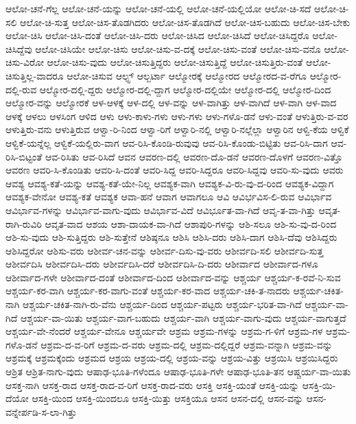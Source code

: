{ಆಲೋ-ಚನೆ-ಗೆಲ್ಲ
ಆಲೋ-ಚನೆ-ಯನ್ನು
ಆಲೋ-ಚನೆ-ಯಲ್ಲಿ
ಆಲೋ-ಚನೆ-ಯಲ್ಲಿಯೋ
ಆಲೋ-ಚಿ-ಸದೆ
ಆಲೋ-ಚಿ-ಸಲಿ
ಆಲೋ-ಚಿ-ಸುತ್ತ
ಆಲೋ-ಚಿಸ-ತೊಡಗಿದರು
ಆಲೋ-ಚಿಸ-ತೊಡಗಿದೆ
ಆಲೋ-ಚಿಸ-ಬಹುದು
ಆಲೋ-ಚಿಸ-ಬೇಕು
ಆಲೋ-ಚಿಸಿ
ಆಲೋ-ಚಿಸಿ-ದಂತೆ
ಆಲೋ-ಚಿಸಿ-ದರು
ಆಲೋ-ಚಿಸಿದ
ಆಲೋ-ಚಿಸಿದೆ
ಆಲೋ-ಚಿಸಿದ್ದರೊ
ಆಲೋ-ಚಿಸಿದ್ದೆವು
ಆಲೋ-ಚಿಸಿಯೇ
ಆಲೋ-ಚಿಸು
ಆಲೋ-ಚಿಸು-ವ-ದಕ್ಕೆ
ಆಲೋ-ಚಿಸು-ವಂತೆ
ಆಲೋ-ಚಿಸು-ವನೊ
ಆಲೋ-ಚಿಸು-ವಿರೋ
ಆಲೋ-ಚಿಸು-ವುದು
ಆಲೋ-ಚಿಸುತ್ತಿದ್ದರು
ಆಲೋ-ಚಿಸುತ್ತಿದ್ದೆ
ಆಲೋ-ಚಿಸುತ್ತಿರು-ವಂತೆ
ಆಲೋ-ಚಿಸುತ್ತಿಲ್ಲ-ವಾದರೂ
ಆಲೋ-ಚಿಸುವ
ಆಲ್ಫ್ಸ್
ಆಲ್ಬರ್ಟಾ
ಆಲ್ಮೋರಕ್ಕೆ
ಆಲ್ಮೋರದ
ಆಲ್ಮೋರದ-ವ-ರೆಗೂ
ಆಲ್ಮೋರ-ದಲ್ಲಿ-ರುವ
ಆಲ್ಮೋರ-ದಲ್ಲಿ-ದ್ದರು
ಆಲ್ಮೋರ-ದಲ್ಲಿ-ದ್ದಾಗ
ಆಲ್ಮೋರ-ದಲ್ಲಿಯೇ
ಆಲ್ಮೋರ-ದಲ್ಲಿ
ಆಲ್ಮೋರ-ದಿಂದ
ಆಲ್ಮೋರ-ವನ್ನು
ಆಲ್ಮೋರಕೆ
ಆಳ-ಆಳಕ್ಕೆ
ಆಳ-ದಲ್ಲಿ
ಆಳ-ವನ್ನು
ಆಳ-ವಾಗಿತ್ತು
ಆಳ-ವಾಗಿದೆ
ಆಳ-ವಾಗಿ
ಆಳ-ವಾದ
ಆಳಕ್ಕೆ
ಆಳಲು
ಆಳಸಿಂಗ
ಆಳಿದ
ಆಳು
ಆಳು-ಕಾಳು-ಗಳು
ಆಳು-ಗಳು
ಆಳು-ಗಳೊ-ಡನೆ
ಆಳು-ವಂತೆ
ಆಳುತ್ತಿರು-ವ-ವರ
ಆಳುತ್ತಿರು-ವನು
ಆಳುತ್ತಿರುವ
ಆಳ್ವಾ-ರಿ-ನಿಂದ
ಆಳ್ವಾ-ರಿಗೆ
ಆಳ್ವಾರಿ-ನಲ್ಲಿ
ಆಳ್ವಾರಿ-ನಲ್ಲೆಲ್ಲಾ
ಆಳ್ವಾರಿನ
ಆಳ್ವಿ-ಕೆಯ
ಆಳ್ವಿಕೆ
ಆಳ್ವಿಕೆ-ಯನ್ನೆಲ್ಲ
ಆಳ್ವಿಕೆ-ಯಲ್ಲಿರು-ವಾಗ
ಆವ-ರಿಸಿ-ಕೊಂಡಿ-ರುವುವು
ಆವ-ರಿಸಿ-ಕೊಂಡು-ಬಿಟ್ಟಿತು
ಆವ-ರಿಸಿ-ದಾಗ
ಆವ-ರಿಸಿ-ಬಿಟ್ಟಂತೆ
ಆವ-ರಿಸಿತು
ಆವ-ರಿಸಿದೆ
ಆವನ
ಆವರಣ-ದಲ್ಲಿ
ಆವರಣ-ದೊ-ಡನೆ
ಆವರಣ-ದೊಳಗೆ
ಆವರಣ-ವಿತ್ತೊ
ಆವರಣ
ಆವರಿ-ಸಿ-ಕೊಂಡಿತು
ಆವರಿ-ಸಿ-ದಂತೆ
ಆವರಿ-ಸಿದ್ದ
ಆವರಿ-ಸಿದ್ದರೂ
ಆವರಿ-ಸಿದ್ದವು
ಆವರಿ-ಸು-ವುದು
ಆವರು
ಆವಶ್ಯ
ಆವಶ್ಯ-ಕತೆ-ಯನ್ನು
ಆವಶ್ಯ-ಕತೆ-ಯೇ-ನಿಲ್ಲ
ಆವಶ್ಯಕ-ವಾಗಿ
ಆವಶ್ಯಕ-ವಿ-ರು-ವು-ದ-ರಿಂದ
ಆವಶ್ಯಕ-ವಿದ್ದಾಗ
ಆವಶ್ಯಕ-ವೇನೋ
ಆವಶ್ಯ-ಕತೆ
ಆವಶ್ಯಕ
ಆವಾ-ಹನೆ
ಆವಾಗ
ಆವಾಗಲೂ
ಆವಿ
ಆವಿರ್ಭವಿಸ-ಲಿ-ರುವ
ಆವಿರ್ಭಾವ
ಆವಿರ್ಭಾವ-ಗಳನ್ನು
ಆವಿರ್ಭಾವ-ವಾಗು-ವುದು
ಆವಿರ್ಭಾವ-ವಿದೆ
ಆವಿರ್ಭೂತ-ವಾ-ಗಿದೆ
ಆವೃ-ತ-ವಾ-ಗಿತ್ತು
ಆವೃತ-ರಾಗಿ-ರುವಿರಿ
ಆವೃತ-ವಾದ
ಆಶಯ
ಆಶಾ-ದಾಯಕ-ವಾ-ಗಿದೆ
ಆಶಾಪುರಿ-ಗಳನ್ನು
ಆಶಿ-ಸಲೂ
ಆಶಿ-ಸು-ವು-ದ-ರಿಂದ
ಆಶಿ-ಸು-ವುದು
ಆಶಿ-ಸುತ್ತಿದ್ದರು
ಆಶಿ-ಸುತ್ತೇನೆ
ಆಶಿಷ್ಠನೂ
ಆಶಿಸಿ
ಆಶಿಸಿ-ದರು
ಆಶಿಸಿ-ದಾಗ
ಆಶಿಸಿ-ದೆವು
ಆಶಿಸಿದ್ದರು
ಆಶಿಸಿದ್ದರೋ
ಆಶಿಸು-ವರು
ಆಶೀರ್ವ-ಚನ-ವನ್ನು
ಆಶೀರ್ವ-ದಿಸು-ವು-ವರು
ಆಶೀರ್ವದಿ-ಸಲಿ
ಆಶೀರ್ವದಿ-ಸುತ್ತ
ಆಶೀರ್ವದಿಸಿ
ಆಶೀರ್ವದಿಸಿ-ದರು
ಆಶೀರ್ವದಿಸಿ-ದರೆ
ಆಶೀರ್ವದಿಸಿ-ದಿ-ದರು
ಆಶೀರ್ವಾದ
ಆಶೀರ್ವಾದ-ಗಳೂ
ಆಶೀರ್ವಾದ-ಗಳೇ
ಆಶೀರ್ವಾದ-ದಂತೆ
ಆಶೀರ್ವಾದ-ದಿಂದ
ಆಶೀರ್ವಾದ-ವನ್ನು
ಆಶ್ಚರ್ಯ
ಆಶ್ಚರ್ಯ-ಕ-ರವೆ-ನಿ-ಸುವ
ಆಶ್ಚರ್ಯ-ಕರ-ವಾಗಿ
ಆಶ್ಚರ್ಯ-ಕರ-ವಾಗು-ವಂತೆ
ಆಶ್ಚರ್ಯ-ಕರ-ವಾದ
ಆಶ್ಚರ್ಯ-ಚಕಿ-ತ-ನಾದರು
ಆಶ್ಚರ್ಯ-ಚಕಿತ-ನಾಗಿ
ಆಶ್ಚರ್ಯ-ಚಕಿತ-ನಾಗಿ-ರು-ವೆನು
ಆಶ್ಚರ್ಯ-ದಿಂದ
ಆಶ್ಚರ್ಯ-ಪಟ್ಟರು
ಆಶ್ಚರ್ಯ-ಭರಿತ-ವಾ-ಗಿದೆ
ಆಶ್ಚರ್ಯ-ವಾ-ಗಿದೆ
ಆಶ್ಚರ್ಯ-ವಾ-ಯಿತು
ಆಶ್ಚರ್ಯ-ವಾಗ-ಬಹುದು
ಆಶ್ಚರ್ಯ-ವಾಗಿ
ಆಶ್ಚರ್ಯ-ವಾಗು-ವುದು
ಆಶ್ಚರ್ಯ-ವಾಗುತ್ತದೆ
ಆಶ್ಚರ್ಯ-ವೇ-ನೆಂದರೆ
ಆಶ್ಚರ್ಯ-ವೇನೂ
ಆಶ್ಚರ್ಯವೇ
ಆಶ್ರಮ
ಆಶ್ರಮ-ಗಳನ್ನು
ಆಶ್ರಮ-ಗ-ಳಿಗೆ
ಆಶ್ರಮ-ಗಳ
ಆಶ್ರಮ-ಗಳೊ-ಡನೆ
ಆಶ್ರಮ-ದ-ವ-ರಿಗೆ
ಆಶ್ರಮ-ದ-ವರು
ಆಶ್ರಮ-ದಲ್ಲಿ
ಆಶ್ರಮ-ದಲ್ಲಿದ್ದರೆ
ಆಶ್ರಮ-ವನ್ನಾಗಿ
ಆಶ್ರಮ-ವನ್ನು
ಆಶ್ರಮಕ್ಕೆ
ಆಶ್ರಮಕ್ಕೆಂದು
ಆಶ್ರಮದ
ಆಶ್ರಯ
ಆಶ್ರಯ-ದಲ್ಲಿ
ಆಶ್ರಯ-ವನ್ನು
ಆಶ್ರಯ-ವಿತ್ತು
ಆಶ್ರಯಿಸಿ
ಆಶ್ರಯಿಸಿದ್ದರು
ಆಶ್ರಿತ
ಆಶ್ರಿತ-ನಾಗು-ವುದು
ಆಷಾಢ-ಭೂತಿ-ಗಳೆಂದೂ
ಆಷಾಢ-ಭೂತಿ-ಗಳೇ
ಆಷಾಢ-ಭೂತಿ-ತನ
ಆಷ್ಚರ್ಯ-ವಾ-ಯಿತು
ಆಸಕ್ತ-ನಾಗಿ
ಆಸಕ್ತ-ರಾದ
ಆಸಕ್ತ-ರಾದ-ವ-ರಿಗೆ
ಆಸಕ್ತ-ರಾದ-ವರು
ಆಸಕ್ತಿ
ಆಸಕ್ತಿ-ಯಂತೆ
ಆಸಕ್ತಿ-ಯನ್ನು
ಆಸಕ್ತಿ-ಯಿ-ದೆಯೋ
ಆಸಕ್ತಿ-ಯಿಂದ
ಆಸಕ್ತಿ-ಯಿಂದಲೂ
ಆಸಕ್ತಿ-ಯಿತ್ತು
ಆಸಕ್ತಿಯೂ
ಆಸನ
ಆಸನ-ದಲ್ಲಿ
ಆಸನ-ವನ್ನು
ಆಸನ-ವನ್ನೇರ್ಪಡಿ-ಸ-ಲಾ-ಗಿತ್ತು
}
